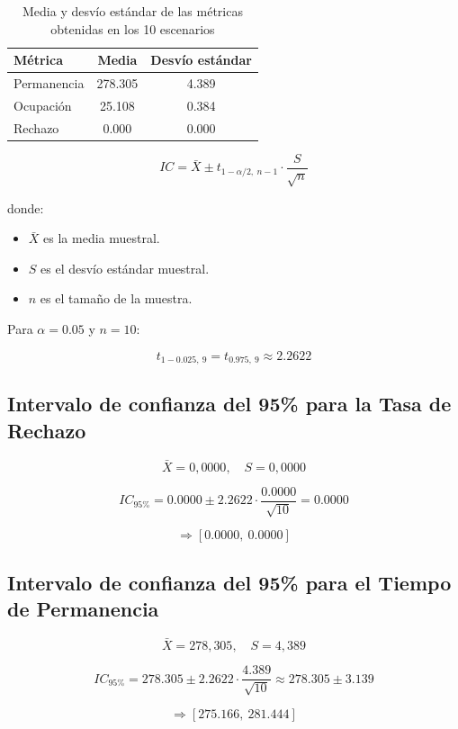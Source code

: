 \documentclass[12pt]{article}
\begin{document}
\begin{table}[H]
\centering
\begin{tabular}{|l|c|c|}
\hline
\textbf{Métrica} & \textbf{Media} & \textbf{Desvío estándar} \\
\hline
Permanencia & 278.305 & 4.389 \\
Ocupación   & 25.108  & 0.384 \\
Rechazo     & 0.000   & 0.000 \\
\hline
\end{tabular}
\caption{Media y desvío estándar de las métricas obtenidas en los 10 escenarios}
\end{table}

\[
IC = \bar{X} \pm t_{1-\alpha/2,\ n-1} \cdot \frac{S}{\sqrt{n}}
\]

donde:
\begin{itemize}
  \item $\bar{X}$ es la media muestral.
  \item $S$ es el desvío estándar muestral.
  \item $n$ es el tamaño de la muestra.
\end{itemize}

Para $\alpha = 0{.}05$ y $n = 10$:

\[
t_{1 - 0{.}025,\ 9} = t_{0{.}975,\ 9} \approx 2{.}2622
\]
\vspace{0.2cm}
\hline

\subsection{Intervalo de confianza del 95\% para la Tasa de Rechazo}
\label{sec:ic_tasa_rechazo}
\[
\bar{X} = 0{,}0000,\quad S = 0{,}0000
\]

\[
IC_{95\%} = 0{.}0000 \pm 2{.}2622 \cdot \frac{0{.}0000}{\sqrt{10}} = 0{.}0000
\]

\[
\Rightarrow \boxed{[0{.}0000,\ 0{.}0000]}
\]
\vspace{0.2cm}
\hline

\subsection{Intervalo de confianza del 95\% para el Tiempo de Permanencia}
\label{sec:ic_permanencia}
\[
\bar{X} = 278{,}305,\quad S = 4{,}389
\]

\[
IC_{95\%} = 278{.}305 \pm 2{.}2622 \cdot \frac{4{.}389}{\sqrt{10}} \approx 278{.}305 \pm 3{.}139
\]

\[
\Rightarrow \boxed{[275{.}166,\ 281{.}444]}
\]
\vspace{0.2cm}
\hline
\end{document}
